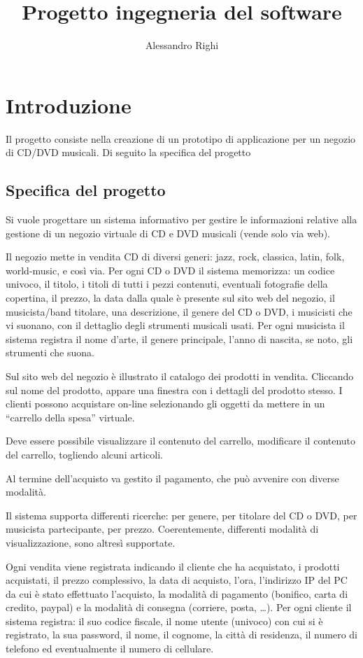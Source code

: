 \documentclass{article}
\author{Alessandro Righi}
\title{Progetto ingegneria del software}
\begin{document}
\maketitle
\tableofcontents

\section{Introduzione}
Il progetto consiste nella creazione di un prototipo di applicazione per un negozio di CD/DVD musicali. 
Di seguito la specifica del progetto

\subsection{Specifica del progetto}	

Si vuole progettare un sistema informativo per gestire le informazioni relative alla gestione di un negozio
virtuale di CD e DVD musicali (vende solo via web).

Il negozio mette in vendita CD di diversi generi: jazz, rock, classica, latin, folk, world-music, e così via.
Per ogni CD o DVD il sistema memorizza: un codice univoco, il titolo, i titoli di tutti i pezzi contenuti,
eventuali fotografie della copertina, il prezzo, la data dalla quale è presente sul sito web del negozio, il
musicista/band titolare, una descrizione, il genere del CD o DVD, i musicisti che vi suonano, con il
dettaglio degli strumenti musicali usati. Per ogni musicista il sistema registra il nome d’arte, il genere
principale, l’anno di nascita, se noto, gli strumenti che suona.

Sul sito web del negozio è illustrato il catalogo dei prodotti in vendita.
Cliccando sul nome del prodotto, appare una finestra con i dettagli del prodotto stesso.
I clienti possono acquistare on-line selezionando gli oggetti da mettere in un “carrello della spesa”
virtuale.

Deve essere possibile visualizzare il contenuto del carrello, modificare il contenuto del carrello, togliendo
alcuni articoli.

Al termine dell’acquisto va gestito il pagamento, che può avvenire con diverse modalità.

Il sistema supporta differenti ricerche: per genere, per titolare del CD o DVD, per musicista partecipante,
per prezzo. Coerentemente, differenti modalità di visualizzazione, sono altresì supportate.

Ogni vendita viene registrata indicando il cliente che ha acquistato, i prodotti acquistati, il prezzo
complessivo, la data di acquisto, l’ora, l’indirizzo IP del PC da cui è stato effettuato l’acquisto, la modalità
di pagamento (bonifico, carta di credito, paypal) e la modalità di consegna (corriere, posta, …).
Per ogni cliente il sistema registra: il suo codice fiscale, il nome utente (univoco) con cui si è registrato,
la sua password, il nome, il cognome, la città di residenza, il numero di telefono ed eventualmente il
numero di cellulare.
\end{document}
